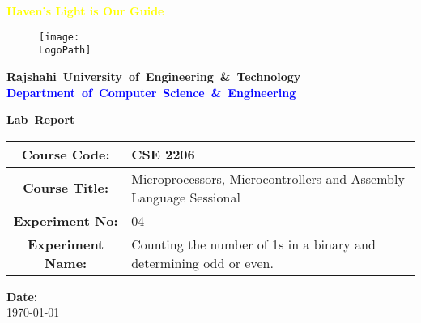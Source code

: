 \documentclass[a4paper,12pt]{report}
\newcommand{\LogoPath}{RUET_logo.png}
\begin{document}
\begin{titlepage}
    \begin{center}

        \textbf{\textcolor{yellow}{\rmfamily Haven's Light is Our Guide}}

        \begin{figure}[h]
            \centering
            \texttt{[image: \\LogoPath]}
        \end{figure}

        \vspace*{0in}
        \Large
        \textbf{\mbox{Rajshahi University of Engineering \& Technology}}
        \large
        \textbf{\mbox{\textcolor{blue}{Department of Computer Science \& Engineering}}}

        \vfill
        \Huge
        \textbf{\mbox{Lab Report}}
        \vfill

        \begin{table}[h]
            \centering
            \begin{tabularx}{0.7\paperwidth}{|c|X|}
                \hline
                \textbf{Course Code:}     & CSE 2206                                                           \\
                \hline
                \textbf{Course Title:}    & Microprocessors, Microcontrollers and Assembly Language Sessional  \\
                \hline
                \textbf{Experiment No:}   & 04                                                                 \\
                \hline
                \textbf{Experiment Name:} & Counting the number of 1s in a binary and determining odd or even. \\
                \hline
            \end{tabularx}
        \end{table}

        \vspace{0.5in}
        \textbf{Date:} \\
        \today

        \vfill

        \begin{table}[h]
            \centering
\end{table}
\end{center}
\end{titlepage}
\end{document}
